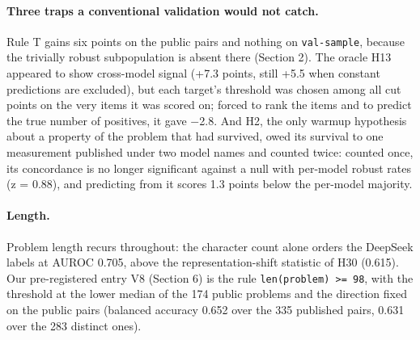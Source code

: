 \paragraph{Three traps a conventional validation would not catch.}
Rule T gains six points on the public pairs and nothing on \texttt{val-sample}, because the trivially robust subpopulation is absent there (Section 2). The oracle H13 appeared to show cross-model signal (+7.3 points, still +5.5 when constant predictions are excluded), but each target's threshold was chosen among all cut points on the very items it was scored on; forced to rank the items and to predict the true number of positives, it gave $-$2.8. And H2, the only warmup hypothesis about a property of the problem that had survived, owed its survival to one measurement published under two model names and counted twice: counted once, its concordance is no longer significant against a null with per-model robust rates (z = 0.88), and predicting from it scores 1.3 points below the per-model majority.

\paragraph{Length.}
Problem length recurs throughout: the character count alone orders the DeepSeek labels at AUROC 0.705, above the representation-shift statistic of H30 (0.615). Our pre-registered entry V8 (Section 6) is the rule \texttt{len(problem) >= 98}, with the threshold at the lower median of the 174 public problems and the direction fixed on the public pairs (balanced accuracy 0.652 over the 335 published pairs, 0.631 over the 283 distinct ones).

